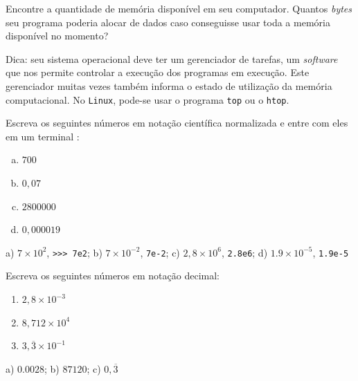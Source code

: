 \begin{exer}
  Encontre a quantidade de memória disponível em seu computador. Quantos \textit{bytes} seu programa poderia alocar de dados caso conseguisse usar toda a memória disponível no momento?
\end{exer}
\begin{resp}
  Dica: seu sistema operacional deve ter um gerenciador de tarefas, um \textit{software} que nos permite controlar a execução dos programas em execução. Este gerenciador muitas vezes também informa o estado de utilização da memória computacional. No \lstinline+Linux+, pode-se usar o programa \lstinline+top+ ou o \lstinline+htop+.
\end{resp}

\begin{exer}
  Escreva os seguintes números em notação científica normalizada e entre com eles em um terminal {\python}:
  \begin{enumerate}[a)]
  \item $700$
  \item $0,07$
  \item $2800000$
  \item $0,000019$
  \end{enumerate}
\end{exer}
\begin{resp}
  a) $7\times 10^2$, \lstinline+>>> 7e2+; b) $7\times 10^{-2}$, \lstinline+7e-2+; c) $2,8\times 10^6$, \lstinline+2.8e6+; d) $1.9\times 10^{-5}$, \lstinline+1.9e-5+
\end{resp}

\begin{exer}
  Escreva os seguintes números em notação decimal:
  \begin{enumerate}
  \item $2,8\times 10^{-3}$
  \item $8,712\times 10^4$
  \item $3,\overline{3}\times 10^{-1}$
  \end{enumerate}
\end{exer}
\begin{resp}
  a) $0.0028$; b) $87120$; c) $0,\overline{3}$
\end{resp}

